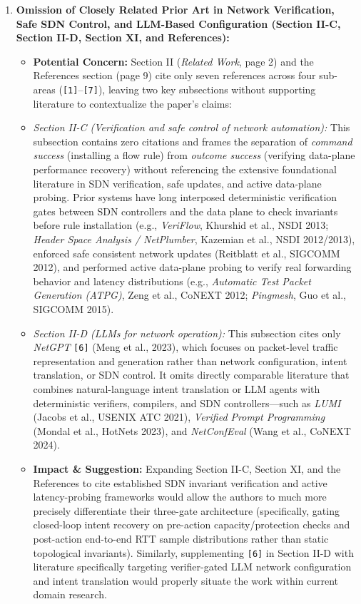 \documentclass[11pt,a4paper]{article}
\begin{document}
\begin{enumerate}[leftmargin=1.6em,itemsep=3pt]
\item \textbf{Omission of Closely Related Prior Art in Network Verification, Safe SDN Control, and LLM-Based Configuration (Section II-C, Section II-D, Section XI, and References):}
\begin{itemize}[leftmargin=1.8em,itemsep=2pt]
\item \textbf{Potential Concern:} Section II (\emph{Related Work}, page 2) and the References section (page 9) cite only seven references across four sub-areas (\texttt{[1]}–\texttt{[7]}), leaving two key subsections without supporting literature to contextualize the paper's claims:
\item \emph{Section II-C (Verification and safe control of network automation):} This subsection contains zero citations and frames the separation of \emph{command success} (installing a flow rule) from \emph{outcome success} (verifying data-plane performance recovery) without referencing the extensive foundational literature in SDN verification, safe updates, and active data-plane probing. Prior systems have long interposed deterministic verification gates between SDN controllers and the data plane to check invariants before rule installation (e.g., \emph{VeriFlow}, Khurshid et al., NSDI 2013; \emph{Header Space Analysis / NetPlumber}, Kazemian et al., NSDI 2012/2013), enforced safe consistent network updates (Reitblatt et al., SIGCOMM 2012), and performed active data-plane probing to verify real forwarding behavior and latency distributions (e.g., \emph{Automatic Test Packet Generation (ATPG)}, Zeng et al., CoNEXT 2012; \emph{Pingmesh}, Guo et al., SIGCOMM 2015).
\item \emph{Section II-D (LLMs for network operation):} This subsection cites only \emph{NetGPT} \texttt{[6]} (Meng et al., 2023), which focuses on packet-level traffic representation and generation rather than network configuration, intent translation, or SDN control. It omits directly comparable literature that combines natural-language intent translation or LLM agents with deterministic verifiers, compilers, and SDN controllers—such as \emph{LUMI} (Jacobs et al., USENIX ATC 2021), \emph{Verified Prompt Programming} (Mondal et al., HotNets 2023), and \emph{NetConfEval} (Wang et al., CoNEXT 2024).
\item \textbf{Impact \& Suggestion:} Expanding Section II-C, Section XI, and the References to cite established SDN invariant verification and active latency-probing frameworks would allow the authors to much more precisely differentiate their three-gate architecture (specifically, gating closed-loop intent recovery on pre-action capacity/protection checks and post-action end-to-end RTT sample distributions rather than static topological invariants). Similarly, supplementing \texttt{[6]} in Section II-D with literature specifically targeting verifier-gated LLM network configuration and intent translation would properly situate the work within current domain research.
\end{itemize}
\end{enumerate}
\end{document}
